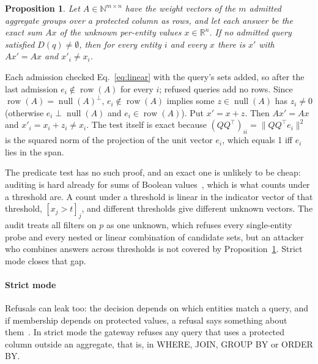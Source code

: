 \documentclass[10pt,journal,compsoc]{IEEEtran}
\newtheorem{proposition}{Proposition}
\begin{document}
\begin{proposition}\label{prop:linear}
Let $A\in\mathbb{N}^{m\times n}$ have the weight vectors of the $m$ admitted aggregate groups over a protected column as rows, and let each answer be the exact sum $Ax$ of the unknown per-entity values $x\in\mathbb{R}^n$. If no admitted query satisfied $D(q)\ne\emptyset$, then for every entity $i$ and every $x$ there is $x'$ with $Ax'=Ax$ and $x'_i\ne x_i$.
\end{proposition}
\begin{IEEEproof}
Each admission checked Eq.~\ref{eq:linear} with the query's sets added, so after the last admission $e_i\notin\operatorname{row}(A)$ for every $i$; refused queries add no rows. Since $\operatorname{row}(A)=\operatorname{null}(A)^{\perp}$, $e_i\notin\operatorname{row}(A)$ implies some $z\in\operatorname{null}(A)$ has $z_i\ne0$ (otherwise $e_i\perp\operatorname{null}(A)$ and $e_i\in\operatorname{row}(A)$). Put $x'=x+z$. Then $Ax'=Ax$ and $x'_i=x_i+z_i\ne x_i$. The test itself is exact because $(QQ^{\top})_{ii}=\lVert QQ^{\top}e_i\rVert^2$ is the squared norm of the projection of the unit vector $e_i$, which equals 1 iff $e_i$ lies in the span.
\end{IEEEproof}

The predicate test has no such proof, and an exact one is unlikely to be cheap: auditing is hard already for sums of Boolean values~\cite{kleinberg2003boolean}, which is what counts under a threshold are. A count under a threshold is linear in the indicator vector of that threshold, $[x_j>t]_j$, and different thresholds give different unknown vectors. The audit treats all filters on $p$ as one unknown, which refuses every single-entity probe and every nested or linear combination of candidate sets, but an attacker who combines answers across thresholds is not covered by Proposition~\ref{prop:linear}. Strict mode closes that gap.

\paragraph*{Strict mode} Refusals can leak too: the decision depends on which entities match a query, and if membership depends on protected values, a refusal says something about them~\cite{kenthapadi2005simulatable}. In strict mode the gateway refuses any query that uses a protected column outside an aggregate, that is, in WHERE, JOIN, GROUP BY or ORDER BY.
\end{document}
